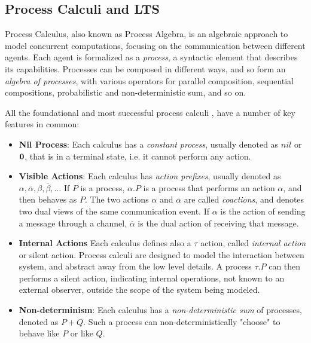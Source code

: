 \subsection{Process Calculi and LTS}


Process Calculus, also known as Process Algebra, is an algebraic approach to model concurrent computations, focusing on the communication between different agents. Each agent is formalized as a \textit{process}, a syntactic element that describes its capabilities. Processes can be composed in different ways, and so form an \textit{algebra of processes}, with various operators for parallel composition, sequential compositions, probabilistic and non-deterministic sum, and so on.

All the foundational and most successful process calculi \cite{milnerCalculusCommunicatingSystems1980, bergstraAlgebraCommunicatingProcesses1985, 
hoareCommunicatingSequentialProcesses1978, milnerCommunicatingMobileSystems1999},  have a number of key features in common: \begin{itemize}
\item \textbf{Nil Process}: Each calculus has a \textit{constant process}, usually denoted as $nil$ or $\mathbf{0}$, that is in a terminal state, i.e. it cannot perform any action.
\item \textbf{Visible Actions}: Each calculus has \textit{action prefixes}, usually denoted as $\alpha, \overline{\alpha}, \beta, \overline{\beta}, \ldots$ If $P$ is a process, $\alpha.P$ is a process that performs an action $\alpha$, and then behaves as $P$. The two actions $\alpha$ and $\overline{\alpha}$ are called \textit{coactions}, and denotes two dual views of the same communication event. If $\alpha$ is the action of sending a message through a channel, $\overline{\alpha}$ is the dual action of receiving that message. 
\item \textbf{Internal Actions} Each calculus defines also a $\tau$ action, called \textit{internal action} or silent action. Process calculi are designed to model the interaction between system, and abstract away from the low level details. A process $\tau.P$ can then performs a silent action, indicating internal operations, not known to an external observer, outside the scope of the system being modeled. 
\item \textbf{Non-determinism}: Each calculus has a \textit{non-deterministic sum} of processes, denoted as $P + Q$. Such a process can non-deterministically "choose" to behave like $P$ or like $Q$. 

\end{itemize}
